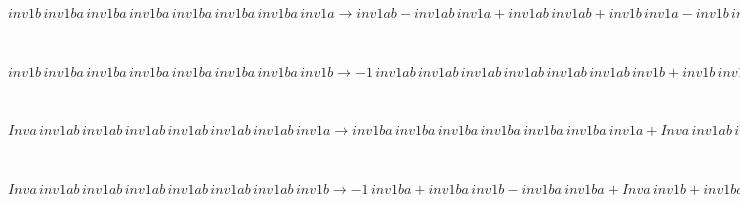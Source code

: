 \begin{minipage}{6in}
$
inv1b\,
 inv1ba\,
 inv1ba\,
 inv1ba\,
 inv1ba\,
 inv1ba\,
 inv1ba\,
 inv1a\rightarrow inv1ab - inv1ab\,
 inv1a + inv1ab\,
 inv1ab + inv1b\,
 inv1a - inv1b\,
 inv1ab - inv1ab\,
 inv1ab\,
 inv1a + inv1ab\,
 inv1ab\,
 inv1ab + inv1b\,
 inv1ab\,
 inv1a - inv1b\,
 inv1ab\,
 inv1ab - inv1ab\,
 inv1ab\,
 inv1ab\,
 inv1a + inv1ab\,
 inv1ab\,
 inv1ab\,
 inv1ab + inv1b\,
 inv1ab\,
 inv1ab\,
 inv1a - inv1b\,
 inv1ab\,
 inv1ab\,
 inv1ab - inv1ab\,
 inv1ab\,
 inv1ab\,
 inv1ab\,
 inv1a + inv1ab\,
 inv1ab\,
 inv1ab\,
 inv1ab\,
 inv1ab + inv1b\,
 inv1ab\,
 inv1ab\,
 inv1ab\,
 inv1a - inv1b\,
 inv1ab\,
 inv1ab\,
 inv1ab\,
 inv1ab - inv1ab\,
 inv1ab\,
 inv1ab\,
 inv1ab\,
 inv1ab\,
 inv1a + inv1ab\,
 inv1ab\,
 inv1ab\,
 inv1ab\,
 inv1ab\,
 inv1ab + inv1b\,
 inv1ab\,
 inv1ab\,
 inv1ab\,
 inv1ab\,
 inv1a - inv1b\,
 inv1ab\,
 inv1ab\,
 inv1ab\,
 inv1ab\,
 inv1ab - inv1ab\,
 inv1ab\,
 inv1ab\,
 inv1ab\,
 inv1ab\,
 inv1ab\,
 inv1a + inv1b\,
 inv1ab\,
 inv1ab\,
 inv1ab\,
 inv1ab\,
 inv1ab\,
 inv1a - inv1b\,
 inv1ab\,
 inv1ab\,
 inv1ab\,
 inv1ab\,
 inv1ab\,
 inv1ab + inv1b\,
 inv1ab\,
 inv1ab\,
 inv1ab\,
 inv1ab\,
 inv1ab\,
 inv1ab\,
 inv1a
$
\end{minipage}\medskip \\
\begin{minipage}{6in}
$
inv1b\,
 inv1ba\,
 inv1ba\,
 inv1ba\,
 inv1ba\,
 inv1ba\,
 inv1ba\,
 inv1b\rightarrow -1\,
 inv1ab\,
 inv1ab\,
 inv1ab\,
 inv1ab\,
 inv1ab\,
 inv1ab\,
 inv1b + inv1b\,
 inv1ba\,
 inv1ba\,
 inv1ba\,
 inv1ba\,
 inv1ba\,
 inv1ba + inv1b\,
 inv1ab\,
 inv1ab\,
 inv1ab\,
 inv1ab\,
 inv1ab\,
 inv1ab\,
 inv1b
$
\end{minipage}\medskip \\
\begin{minipage}{6in}
$
Inva\,
 inv1ab\,
 inv1ab\,
 inv1ab\,
 inv1ab\,
 inv1ab\,
 inv1ab\,
 inv1a\rightarrow inv1ba\,
 inv1ba\,
 inv1ba\,
 inv1ba\,
 inv1ba\,
 inv1ba\,
 inv1a + Inva\,
 inv1ab\,
 inv1ab\,
 inv1ab\,
 inv1ab\,
 inv1ab\,
 inv1ab
$
\end{minipage}\medskip \\
\begin{minipage}{6in}
$
Inva\,
 inv1ab\,
 inv1ab\,
 inv1ab\,
 inv1ab\,
 inv1ab\,
 inv1ab\,
 inv1b\rightarrow -1\,
 inv1ba + inv1ba\,
 inv1b - inv1ba\,
 inv1ba + Inva\,
 inv1b + inv1ba\,
 inv1ba\,
 inv1b - inv1ba\,
 inv1ba\,
 inv1ba + inv1ba\,
 inv1ba\,
 inv1ba\,
 inv1b - inv1ba\,
 inv1ba\,
 inv1ba\,
 inv1ba + inv1ba\,
 inv1ba\,
 inv1ba\,
 inv1ba\,
 inv1b - inv1ba\,
 inv1ba\,
 inv1ba\,
 inv1ba\,
 inv1ba + inv1ba\,
 inv1ba\,
 inv1ba\,
 inv1ba\,
 inv1ba\,
 inv1b - inv1ba\,
 inv1ba\,
 inv1ba\,
 inv1ba\,
 inv1ba\,
 inv1ba + inv1ba\,
 inv1ba\,
 inv1ba\,
 inv1ba\,
 inv1ba\,
 inv1ba\,
 inv1b
$
\end{minipage}\medskip \\
